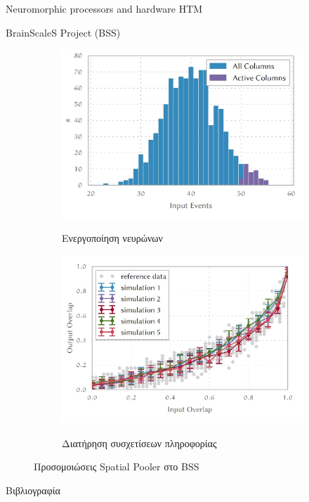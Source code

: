 \documentclass[a4paper,11pt]{article}
\begin{document}
\begin{section}{Neuromorphic processors and hardware HTM}
\begin{subsection}{BrainScaleS Project (BSS)}
\begin{figure} [H]
\begin{subfigure}{0.5\columnwidth}
    {\includegraphics[width=\columnwidth,clip=true]{pics/spatialsim1.jpg}}
    \caption{Ενεργοποίηση νευρώνων} \label{fig:spatial_sim_1}
  \end{subfigure}%
  \begin{subfigure}{0.5\columnwidth}
    \centering
    {\includegraphics[width=\columnwidth,clip=true]{pics/spatialsim2.jpg}}
    \caption{Διατήρηση συσχετίσεων πληροφορίας} \label{fig:spatial_sim_2}
  \end{subfigure}
  \caption{Προσομοιώσεις Spatial Pooler στο BSS}
\end{figure}

\end{subsection}
\end{section}

\newpage
\nocite{*}
\begin{section}{Βιβλιογραφία}
	\printbibliography
\end{section}
\end{document}
